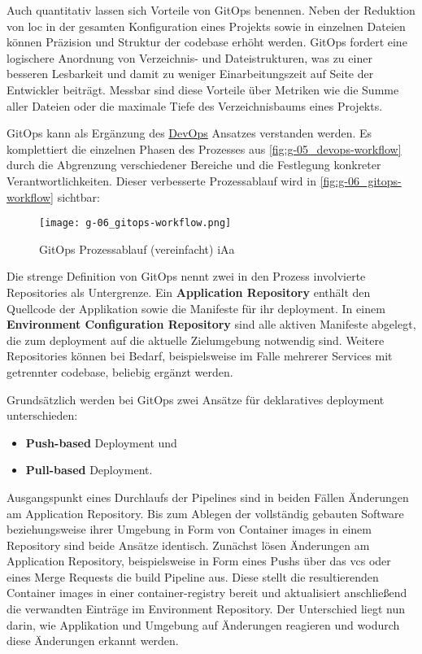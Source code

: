 Auch quantitativ lassen sich Vorteile von GitOps benennen. Neben der Reduktion von \Gls{loc} in der gesamten Konfiguration eines Projekts sowie in einzelnen Dateien können Präzision und Struktur der \Gls{codebase} erhöht werden. GitOps fordert eine logischere Anordnung von Verzeichnis- und Dateistrukturen, was zu einer besseren Lesbarkeit und damit zu weniger Einarbeitungszeit auf Seite der Entwickler beiträgt. Messbar sind diese Vorteile über Metriken wie die Summe aller Dateien oder die maximale Tiefe des Verzeichnisbaums eines Projekts. \cite{008:GitOps-Approach-to-Cloud-Cluster-System-Deployment}

GitOps kann als Ergänzung des \hyperref[sec:03-01_devops]{DevOps} Ansatzes verstanden werden. Es komplettiert die einzelnen Phasen des Prozesses aus \autoref{fig:g-05_devops-workflow} durch die Abgrenzung verschiedener Bereiche und die Festlegung konkreter Verantwortlichkeiten. Dieser verbesserte Prozessablauf wird in \autoref{fig:g-06_gitops-workflow} sichtbar:

\begin{figure}[h]
    \centering
    \texttt{[image: g-06\_gitops-workflow.png]}
    \caption{GitOps Prozessablauf (vereinfacht) \acrshort{iAa} \citeauthor{008:GitOps-Approach-to-Cloud-Cluster-System-Deployment}}
    \label{fig:g-06_gitops-workflow}
\end{figure}

Die strenge Definition von GitOps nennt zwei in den Prozess involvierte Repositories als Untergrenze. Ein \textbf{Application Repository} enthält den Quellcode der Applikation sowie die Manifeste für ihr \Gls{deployment}. In einem \textbf{Environment Configuration Repository} sind alle aktiven Manifeste abgelegt, die zum \Gls{deployment} auf die aktuelle Zielumgebung notwendig sind. Weitere Repositories können bei Bedarf, beispielsweise im Falle mehrerer Services mit getrennter \Gls{codebase}, beliebig ergänzt werden. \cite{109:GitOps}

Grundsätzlich werden bei GitOps zwei Ansätze für deklaratives \Gls{deployment} unterschieden:

\begin{itemize}
    \item \textbf{Push-based} Deployment und
    \item \textbf{Pull-based} Deployment.
\end{itemize}

Ausgangspunkt eines Durchlaufs der Pipelines sind in beiden Fällen Änderungen am Application Repository. Bis zum Ablegen der vollständig gebauten Software beziehungsweise ihrer Umgebung in Form von Container \Glspl{image} in einem Repository sind beide Ansätze identisch. Zunächst lösen Änderungen am Application Repository, beispielsweise in Form eines Pushs über das \Gls{vcs} oder eines Merge Requests die \Gls{build} Pipeline aus. Diese stellt die resultierenden Container \Glspl{image} in einer \Gls{container-registry} bereit und aktualisiert anschließend die verwandten Einträge im Environment Repository. \cite{007:Analysis-of-Declarative-and-Pull-based-Deployment-Models-on-GitOps} Der Unterschied liegt nun darin, wie Applikation und Umgebung auf Änderungen reagieren und wodurch diese Änderungen erkannt werden.

